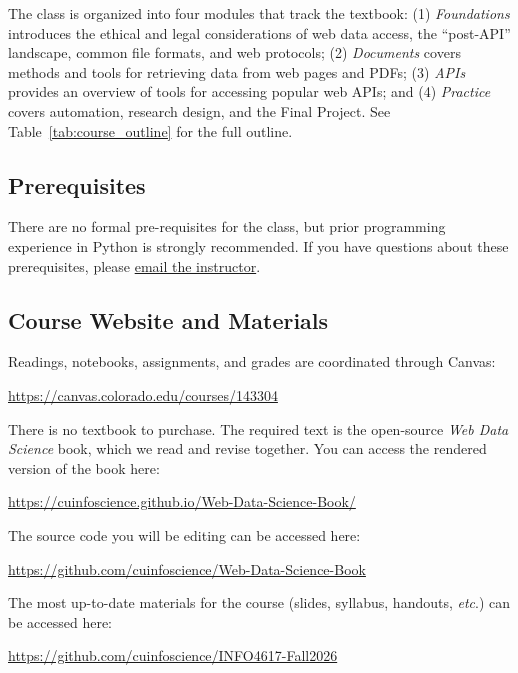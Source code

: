 \documentclass[11pt]{memoir}
\makeatletter
\def\canvasurl{https://canvas.colorado.edu/courses/143304}
\def\githuburl{https://github.com/cuinfoscience/INFO4617-Fall2026}
\def\bookurl{https://cuinfoscience.github.io/Web-Data-Science-Book/}
\def\bookgithuburl{https://github.com/cuinfoscience/Web-Data-Science-Book}
\def\instructoremail{brian.keegan@colorado.edu}
\makeatother
\begin{document}
The class is organized into four modules that track the textbook: (1) \textit{Foundations} introduces the ethical and legal considerations of web data access, the ``post-API'' landscape, common file formats, and web protocols; (2) \textit{Documents} covers methods and tools for retrieving data from web pages and PDFs; (3) \textit{APIs} provides an overview of tools for accessing popular web APIs; and (4) \textit{Practice} covers automation, research design, and the Final Project. See Table~\ref{tab:course_outline} for the full outline.

\subsection{Prerequisites}
There are no formal pre-requisites for the class, but prior programming experience in Python is strongly recommended. If you have questions about these prerequisites, please \href{mailto:\instructoremail}{email the instructor}.

\subsection{Course Website and Materials}
Readings, notebooks, assignments, and grades are coordinated through Canvas:
\vspace{-8pt}
    \begin{center}
    \href{\canvasurl}{\canvasurl}
    \end{center}
\vspace{-8pt}

There is no textbook to purchase. The required text is the open-source \textit{Web Data Science} book, which we read and revise together. You can access the rendered version of the book here:
\vspace{-8pt}
    \begin{center}
    \href{\bookurl}{\bookurl}
    \end{center}
\vspace{-8pt}

The source code you will be editing can be accessed here:
\vspace{-8pt}
    \begin{center}
    \href{\bookgithuburl}{\bookgithuburl}
    \end{center}
\vspace{-8pt}

The most up-to-date materials for the course (slides, syllabus, handouts, \textit{etc}.) can be accessed here:
\vspace{-8pt}
    \begin{center}
    \href{\bookurl}{\githuburl}
    \end{center}
\vspace{-8pt}
\end{document}
